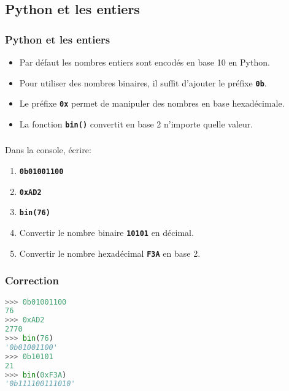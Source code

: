 \documentclass[svgnames,11pt]{beamer}
\begin{document}
\subsection{Python et les entiers}
\begin{frame}
    \frametitle{Python et les entiers}
\begin{itemize}
    \item<1-> Par défaut les nombres entiers sont encodés en base 10 en Python.
    \item<2-> Pour utiliser des nombres binaires, il suffit d'ajouter le préfixe \texttt{\textbf{0b}}.
    \item<3-> Le préfixe \texttt{\textbf{0x}} permet de manipuler des nombres en base hexadécimale.
    \item<4-> La fonction \texttt{\textbf{bin()}} convertit en base 2 n'importe quelle valeur.
\end{itemize}
\end{frame}
\begin{frame}
    \frametitle{}

    \begin{activite}
        Dans la console, écrire:
        \begin{enumerate}
        \item \textbf{\texttt{0b01001100}}
        \item \textbf{\texttt{0xAD2}}
        \item \textbf{\texttt{bin(76)}}
        \item Convertir le nombre binaire \texttt{\textbf{10101}} en décimal.
        \item Convertir le nombre hexadécimal \texttt{\textbf{F3A}} en base 2.
        \end{enumerate}
        \end{activite}

\end{frame}
\begin{frame}[fragile]
    \frametitle{Correction}

\begin{center}
\begin{lstlisting}[language=Python , basicstyle=\ttfamily\small, xleftmargin=2em, xrightmargin=2em]
>>> 0b01001100
76
>>> 0xAD2
2770
>>> bin(76)
'0b01001100'
>>> 0b10101
21
>>> bin(0xF3A)
'0b111100111010'
\end{lstlisting}
\end{center}

\end{frame}
\end{document}
